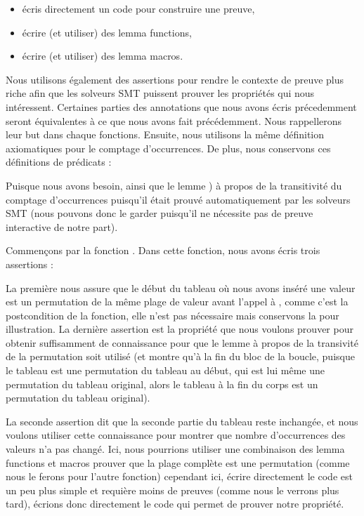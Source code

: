 \begin{itemize}
    \item écris directement un code pour construire une preuve,
    \item écrire (et utiliser) des lemma functions,
    \item écrire (et utiliser) des lemma macros.
\end{itemize}


Nous utilisons également des assertions pour rendre le contexte de preuve plus
riche afin que les solveurs SMT puissent prouver les propriétés qui nous intéressent.
Certaines parties des annotations que nous avons écris précedemment seront
équivalentes à ce que nous avons fait précédemment. Nous rappellerons leur
but dans chaque fonctions. Ensuite, nous utilisons la même définition axiomatiques
pour le comptage d'occurrences. De plus, nous conservons ces définitions de
prédicats :




Puisque nous avons besoin, ainsi que le lemme ) à propos de la transitivité du
comptage d'occurrences puisqu'il était prouvé automatiquement par les solveurs
SMT (nous pouvons donc le garder puisqu'il ne nécessite pas de preuve interactive
de notre part).




Commençons par la fonction . Dans cette fonction,
nous avons écris trois assertions :




La première nous assure que le début du tableau où nous avons inséré une valeur
est un permutation de la même plage de valeur avant l'appel à ,
comme c'est la postcondition de la fonction, elle n'est pas nécessaire mais
conservons la pour illustration. La dernière assertion est la propriété que
nous voulons prouver pour obtenir suffisamment de connaissance pour que le
lemme à propos de la transivité de la permutation soit utilisé (et montre qu'à
la fin du bloc de la boucle, puisque le tableau est une permutation du tableau
au début, qui est lui même une permutation du tableau original, alors le tableau
à la fin du corps est un permutation du tableau original).


La seconde assertion dit que la seconde partie du tableau reste inchangée, et nous
voulons utiliser cette connaissance pour montrer que nombre d'occurrences des
valeurs n'a pas changé. Ici, nous pourrions utiliser une combinaison des lemma
functions et macros prouver que la plage complète est une permutation (comme nous
le ferons pour l'autre fonction) cependant ici, écrire directement le code est
un peu plus simple et requière moins de preuves (comme nous le verrons plus tard),
écrions donc directement le code qui permet de prouver notre propriété.


